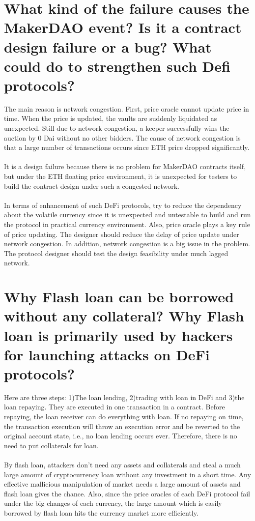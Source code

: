 \documentclass{article}
\begin{document}
\section{What kind of the failure causes the MakerDAO event? Is it a contract design
failure or a bug? What could do to strengthen such Defi protocols?}
The main reason is network congestion. 
First, price oracle cannot update price in time. 
When the price is updated, the vaults are suddenly liquidated as unexpected. 
Still due to network congestion, a keeper successfully wins the auction by 0 Dai without no other bidders. 
The cause of network congestion is that a large number of transactions occurs since ETH price dropped significantly.\\\\
It is a design failure because there is no problem for MakerDAO contracts itself,
but under the ETH floating price environment, 
it is unexpected for testers to build the contract design under such a congested network.\\\\
In terms of enhancement of such DeFi protocols, try to reduce the dependency about the volatile currency
since it is unexpected and untestable to build and run the protocol in practical currency environment.
Also, price oracle plays a key rule of price updating. The designer should reduce the delay of price update under network congestion. In addition, network congestion is a big issue in the problem. The protocol designer should test the design feasibility under much lagged network.
\section{Why Flash loan can be borrowed without any collateral? Why Flash loan is
primarily used by hackers for launching attacks on DeFi protocols?}
Here are three steps:
1)The loan lending, 2)trading with loan in DeFi 
and 3)the loan repaying. They are executed in one transaction in a contract.
Before repaying, the loan receiver can do everything with loan. 
If no repaying on time, the transaction execution will throw an execution error and be reverted to the original account state,
i.e., no loan lending occurs ever. Therefore, there is no need to put collaterals for loan.\\\\
By flash loan, attackers don't need any assets and collaterals and steal a much large amount of
cryptocurrency loan without any investment in a short time. 
Any effective mallicious manipulation of market needs a large amount of assets 
and flash loan gives the chance. 
Also, since the price oracles of each DeFi protocol fail under the big changes of each currency, the large amount which is easily borrowed by flash loan hits the currency market more efficiently.
\end{document}
